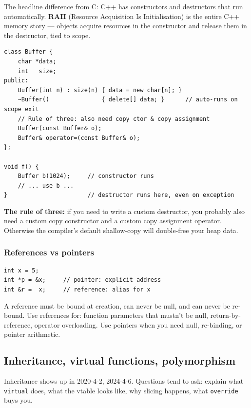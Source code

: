 \documentclass[11pt,a4paper]{article}
\begin{document}
\begin{useful}
The headline difference from C: C++ has constructors and destructors that run automatically. \textbf{RAII} (Resource Acquisition Is Initialisation) is the entire C++ memory story --- objects acquire resources in the constructor and release them in the destructor, tied to scope.
\end{useful}

\begin{lstlisting}
class Buffer {
    char *data;
    int   size;
public:
    Buffer(int n) : size(n) { data = new char[n]; }
    ~Buffer()               { delete[] data; }      // auto-runs on scope exit
    // Rule of three: also need copy ctor & copy assignment
    Buffer(const Buffer& o);
    Buffer& operator=(const Buffer& o);
};

void f() {
    Buffer b(1024);     // constructor runs
    // ... use b ...
}                       // destructor runs here, even on exception
\end{lstlisting}

\textbf{The rule of three:} if you need to write a custom destructor, you probably also need a custom copy constructor and a custom copy assignment operator. Otherwise the compiler's default shallow-copy will double-free your heap data.

\subsubsection*{References vs pointers}

\begin{lstlisting}
int x = 5;
int *p = &x;     // pointer: explicit address
int &r =  x;     // reference: alias for x
\end{lstlisting}
A reference must be bound at creation, can never be null, and can never be re-bound. Use references for: function parameters that mustn't be null, return-by-reference, operator overloading. Use pointers when you need null, re-binding, or pointer arithmetic.

\subsection{Inheritance, virtual functions, polymorphism}

\begin{useful}
Inheritance shows up in 2020-4-2, 2024-4-6. Questions tend to ask: explain what \texttt{virtual} does, what the vtable looks like, why slicing happens, what \texttt{override} buys you.
\end{useful}
\end{document}
